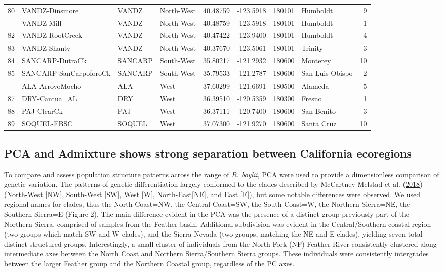\documentclass[proquest,12pt,final]{ucthesis-CA2012} %
\begin{document}
\begin{ucmainmatter}
\begin{longtable}[t]{rlllrrrlr}
80 & VANDZ-Dinsmore & VANDZ & North-West & 40.48759 & -123.5918 & 180101 & Humboldt & 9\\
\addlinespace
81 & VANDZ-Mill & VANDZ & North-West & 40.48759 & -123.5918 & 180101 & Humboldt & 1\\
82 & VANDZ-RootCreek & VANDZ & North-West & 40.47422 & -123.9400 & 180101 & Humboldt & 4\\
83 & VANDZ-Shanty & VANDZ & North-West & 40.37670 & -123.5061 & 180101 & Trinity & 3\\
84 & SANCARP-DutraCk & SANCARP & South-West & 35.80217 & -121.2932 & 180600 & Monterey & 10\\
85 & SANCARP-SanCarpoforoCk & SANCARP & South-West & 35.79533 & -121.2787 & 180600 & San Luis Obispo & 2\\
\addlinespace
86 & ALA-ArroyoMocho & ALA & West & 37.60299 & -121.6691 & 180500 & Alameda & 5\\
87 & DRY-Cantua\_AL & DRY & West & 36.39510 & -120.5359 & 180300 & Fresno & 1\\
88 & PAJ-ClearCk & PAJ & West & 36.37111 & -120.7400 & 180600 & San Benito & 3\\
89 & SOQUEL-EBSC & SOQUEL & West & 37.07300 & -121.9270 & 180600 & Santa Cruz & 10\\*
\end{longtable}\endgroup{}
\clearpage

\hypertarget{pca-and-admixture-shows-strong-separation-between-california-ecoregions}{%
\subsection{PCA and Admixture shows strong separation between California
ecoregions}\label{pca-and-admixture-shows-strong-separation-between-california-ecoregions}}

To compare and assess population structure patterns across the range of
\emph{R. boylii}, PCA were used to provide a dimensionless comparison of
genetic variation. The patterns of genetic differentiation largely
conformed to the clades described by McCartney-Melstad et al.
(\protect\hyperlink{ref-mccartney-melstad_population_2018}{2018})
(North-West {[}NW{]}, South-West {[}SW{]}, West {[}W{]},
North-East{[}NE{]}, and East {[}E{]}), but some notable differences were
observed. We used regional names for clades, thus the North Coast=NW,
the Central Coast=SW, the South Coast=W, the Northern Sierra=NE, the
Southern Sierra=E (Figure 2). The main difference evident in the PCA was
the presence of a distinct group previously part of the Northern Sierra,
comprised of samples from the Feather basin. Additional subdivision was
evident in the Central/Southern coastal region (two groups which match
SW and W clades), and the Sierra Nevada (two groups, matching the NE and
E clades), yielding seven total distinct structured groups.
Interestingly, a small cluster of individuals from the North Fork (NF)
Feather River consistently clustered along intermediate axes between the
North Coast and Northern Sierra/Southern Sierra groups. These
individuals were consistently intergrades between the larger Feather
group and the Northern Coastal group, regardless of the PC axes.


\end{ucmainmatter}
\end{document}
